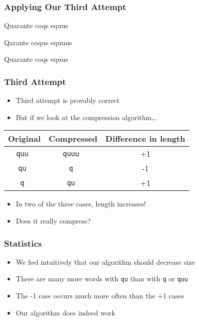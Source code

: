\documentclass{../ucll-slides}
\begin{document}
\begin{frame}
  \frametitle{Applying Our Third Attempt}
  \begin{center}
    Quarante coqs equus
  \end{center}
  \vskip5mm
  \begin{center}
    Qarante coqus equuus
  \end{center}
  \vskip5mm
  \begin{center}
    Quarante coqs equus
  \end{center}
  \begin{center}
  \end{center}
\end{frame}

\begin{frame}
  \frametitle{Third Attempt}
  \begin{itemize}
    \item Third attempt is provably correct
    \item But if we look at the compression algorithm\dots
  \end{itemize}
  \begin{center}
    \begin{tabular}{ccc}
      \bf Original & \bf Compressed & \bf Difference in length \\
      \toprule
      \tt quu & \tt quuu & +1 \\
      \tt qu & \tt q & -1 \\
      \tt q & \tt qu & +1 \\
    \end{tabular}
  \end{center}
  \begin{itemize}
    \item In two of the three cases, length increases!
    \item Does it really compress?
  \end{itemize}
\end{frame}

\begin{frame}
  \frametitle{Statistics}
  \begin{itemize}
    \item We feel intuitively that our algorithm should decrease size
    \item There are many more words with {\tt qu} than with {\tt q} or {\tt quu}
    \item The -1 case occurs much more often than the +1 cases
    \item Our algorithm does indeed work
  \end{itemize}
\end{frame}
\end{document}
